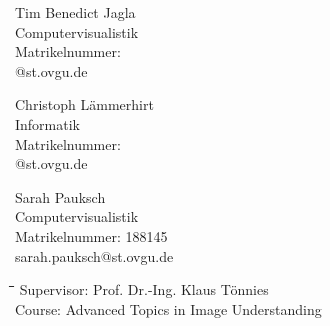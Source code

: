 \documentclass[liststotoc,11pt,a4paper]{article}
\begin{document}
\begin{figure}[htbp]
\begin{minipage}[t]{5cm}
\begin{flushleft}
Tim Benedict Jagla \\
Computervisualistik\\
Matrikelnummer:\\ 
@st.ovgu.de
\end{flushleft}
\end{minipage}
\hfill
\begin{minipage}[t]{5cm}
\begin{flushleft}
Christoph Lämmerhirt \\
Informatik\\
Matrikelnummer: \\
@st.ovgu.de
\end{flushleft}
\end{minipage}
\hfill
\begin{minipage}[t]{5cm}
\vspace{0pt}
\begin{flushleft} 
Sarah Pauksch \\
Computervisualistik\\
Matrikelnummer: 188145\\ 
sarah.pauksch@st.ovgu.de
\end{flushleft}
\end{minipage}
\end{figure}

\vspace{\fill}

\begin{figure}[htbp]
\begin{minipage}[b]{0.475\textwidth}
\vspace{0pt}
\begin{flushright}    
\begin {tabbing}
\hspace*{5cm}\=\hspace{2,5cm}\=\hspace{5cm}\=\hspace{2.5cm}\=\hspace{2.5cm}\=\kill
Supervisor:	\>Prof. Dr.-Ing. Klaus Tönnies\\
Course: \>Advanced Topics in Image Understanding\\

\end{tabbing}
\end{flushright}
\end{minipage}
\hfill
\begin{minipage}[b]{0.475\textwidth}
\centering
\end{minipage}
\end{figure}
\end{document}
